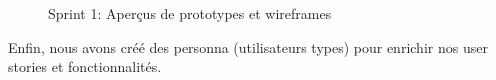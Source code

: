 \documentclass[t, 12pt, usenames,dvipsnames]{article}
\begin{document}
\begin{center}
\begin{figure}[h]
                        \hfill                        {}
                        \hfill
                        \caption{Sprint 1: Aperçus de prototypes et wireframes}
                        \label{fig:sprint1_protos}
                    \end{figure}
            \end{center}   
                
                \newpage
                
                \noindent Enfin, nous avons créé des personna (utilisateurs types) pour enrichir nos user stories et fonctionnalités.
                
\end{document}
